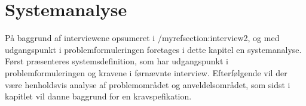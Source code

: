 \chapter{Systemanalyse}\label{chapter:systemanalyse}
På baggrund af interviewene opsumeret i /myref{section:interview2}, og med udgangspunkt i problemformuleringen foretages i dette kapitel en systemanalyse.
Først præsenteres systemsdefinition, som har udgangspunkt i problemformuleringen og kravene i førnævnte interview.
Efterfølgende vil der være henholdsvis analyse af problemområdet og anveldelsområdet, som sidst i kapitlet vil danne baggrund for en kravspefikation.





